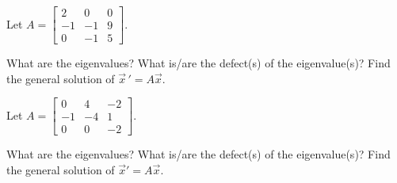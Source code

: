 \begin{exercise}\ansMark%
Let $A =
\left[ \begin{smallmatrix}
2 & 0 & 0 \\
-1 & -1 & 9 \\
0 & -1 & 5
\end{smallmatrix}\right]$.  
\begin{tasks}
\task What are the eigenvalues?
\task What is/are the defect(s) of the eigenvalue(s)?
\task Find the general solution of $\vec{x}\,' = A\vec{x}$.
\end{tasks}
\end{exercise}

\begin{exercise}
\pagebreak[2]
Let
$A = \left[ \begin{smallmatrix}
0 & 4 & -2 \\
-1 & -4 & 1 \\
0 & 0 & -2
\end{smallmatrix} \right]$.
\begin{tasks}
\task What are the eigenvalues?
\task What is/are the defect(s) of the eigenvalue(s)?
\task Find the general solution of ${\vec{x}}' = A \vec{x}$.
\end{tasks}
\end{exercise}

